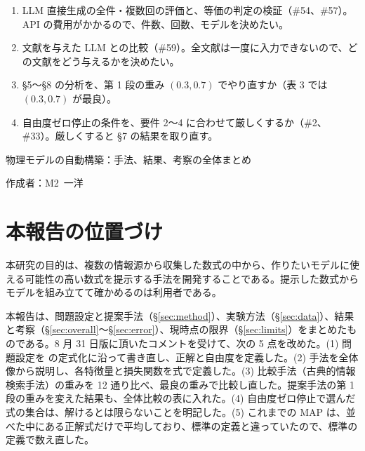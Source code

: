 \documentclass[11pt,a4paper]{ltjsarticle}
\begin{document}
\bigskip
{}\par\smallskip
\begin{enumerate}[leftmargin=2em]
  \item LLM 直接生成の全件・複数回の評価と、等価の判定の検証（\#54、\#57）。API の費用がかかるので、件数、回数、モデルを決めたい。
  \item 文献を与えた LLM との比較（\#59）。全文献は一度に入力できないので、どの文献をどう与えるかを決めたい。
  \item \S 5〜\S 8 の分析を、第 1 段の重み $(0.3, 0.7)$ でやり直すか（表 3 では $(0.3, 0.7)$ が最良）。
  \item 自由度ゼロ停止の条件を、要件 2〜4 に合わせて厳しくするか（\#2、\#33）。厳しくすると \S 7 の結果を取り直す。
\end{enumerate}
\clearpage
\restoregeometry
\setcounter{page}{1}


\begin{center}
{\sffamily\large 物理モデルの自動構築：手法、結果、考察の全体まとめ}
\end{center}
\vspace{0.3em}
\hfill 作成者：M2\ 一洋
\vspace{0.8em}

\section{本報告の位置づけ}
本研究の目的は、複数の情報源から収集した数式の中から、作りたいモデルに使える可能性の高い数式を提示する手法を開発することである。提示した数式からモデルを組み立てて確かめるのは利用者である。

本報告は、問題設定と提案手法（\S\ref{sec:method}）、実験方法（\S\ref{sec:data}）、結果と考察（\S\ref{sec:overall}〜\S\ref{sec:error}）、現時点の限界（\S\ref{sec:limits}）をまとめたものである。8 月 31 日版に頂いたコメントを受けて、次の 5 点を改めた。(1) 問題設定を \citet{CombineEq} の定式化に沿って書き直し、正解と自由度を定義した。(2) 手法を全体像から説明し、各特徴量と損失関数を式で定義した。(3) 比較手法（古典的情報検索手法）の重みを 12 通り比べ、最良の重みで比較し直した。提案手法の第 1 段の重みを変えた結果も、全体比較の表に入れた。(4) 自由度ゼロ停止で選んだ式の集合は、解けるとは限らないことを明記した。(5) これまでの MAP は、並べた中にある正解式だけで平均しており、標準の定義と違っていたので、標準の定義で数え直した。
\end{document}
